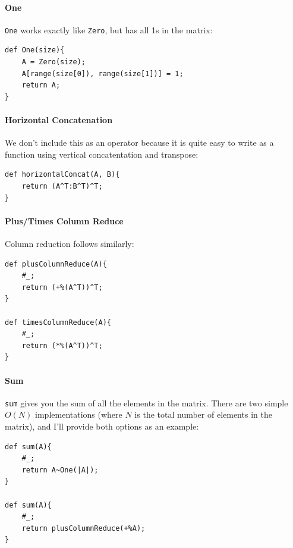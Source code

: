 \paragraph{One}
\verb=One= works exactly like \verb=Zero=, but has all 1s in the matrix:
\begin{lstlisting}
def One(size){
    A = Zero(size);
    A[range(size[0]), range(size[1])] = 1;
    return A;
}
\end{lstlisting}

\paragraph{Horizontal Concatenation}
We don't include this as an operator because it is quite easy to write as a function using vertical concatentation and transpose:
\begin{lstlisting}
def horizontalConcat(A, B){
    return (A^T:B^T)^T;
}
\end{lstlisting}

\paragraph{Plus/Times Column Reduce}
Column reduction follows similarly:
\begin{lstlisting}
def plusColumnReduce(A){
    #_;
    return (+%(A^T))^T;
}

def timesColumnReduce(A){
    #_;
    return (*%(A^T))^T;
}
\end{lstlisting}

\paragraph{Sum}
\verb=sum= gives you the sum of all the elements in the matrix.  There are two simple $O(N)$ implementations (where $N$ is the total number of elements in the matrix), and I'll provide both options as an example:
\begin{lstlisting}
def sum(A){
    #_;
    return A~One(|A|);
}

def sum(A){
    #_;
    return plusColumnReduce(+%A);
}
\end{lstlisting}

